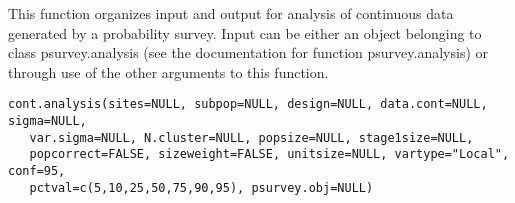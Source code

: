 \begin{Description}\relax
This function organizes input and output for analysis of continuous data 
generated by a probability survey.  Input can be either an object belonging to
class psurvey.analysis (see the documentation for function psurvey.analysis)
or through use of the other arguments to this function.
\end{Description}
\begin{Usage}
\begin{verbatim}
cont.analysis(sites=NULL, subpop=NULL, design=NULL, data.cont=NULL, sigma=NULL,
   var.sigma=NULL, N.cluster=NULL, popsize=NULL, stage1size=NULL,
   popcorrect=FALSE, sizeweight=FALSE, unitsize=NULL, vartype="Local", conf=95,
   pctval=c(5,10,25,50,75,90,95), psurvey.obj=NULL)
\end{verbatim}
\end{Usage}
